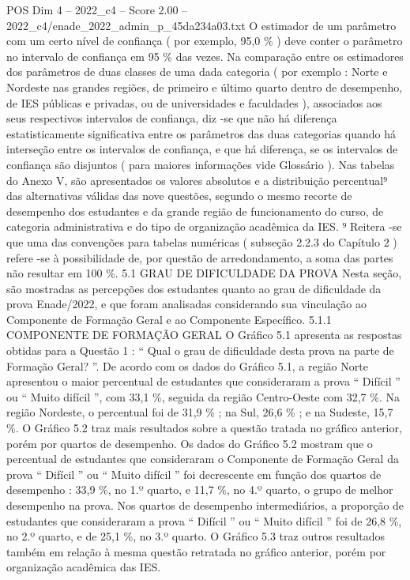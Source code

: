\begin{textsample}{POS Dim 4 – 2022\_c4 – Score 2.00 – 2022\_c4/enade\_2022\_admin\_p\_45da234a03.txt}
O estimador de um parâmetro com um certo nível de confiança ( por exemplo, 95,0 \% ) deve conter o parâmetro no intervalo de confiança em 95 \% das vezes.
Na comparação entre os estimadores dos parâmetros de duas classes de uma dada categoria ( por exemplo : Norte e Nordeste nas grandes regiões, de primeiro e último quarto dentro de desempenho, de IES públicas e privadas, ou de universidades e faculdades ), associados aos seus respectivos intervalos de confiança, diz -se que não há diferença estatisticamente significativa entre os parâmetros das duas categorias quando há interseção entre os intervalos de confiança, e que há diferença, se os intervalos de confiança são disjuntos ( para maiores informações vide Glossário ).
Nas tabelas do Anexo V, são apresentados os valores absolutos e a distribuição percentual⁹ das alternativas válidas das nove questões, segundo o mesmo recorte de desempenho dos estudantes e da grande região de funcionamento do curso, de categoria administrativa e do tipo de organização acadêmica da IES. ⁹ Reitera -se que uma das convenções para tabelas numéricas ( subseção 2.2.3 do Capítulo 2 ) refere -se à possibilidade de, por questão de arredondamento, a soma das partes não resultar em 100 \%. 5.1 GRAU DE DIFICULDADE DA PROVA Nesta seção, são mostradas as percepções dos estudantes quanto ao grau de dificuldade da prova Enade/2022, e que foram analisadas considerando sua vinculação ao Componente de Formação Geral e ao Componente Específico. 5.1.1 COMPONENTE DE FORMAÇÃO GERAL O Gráfico 5.1 apresenta as respostas obtidas para a Questão 1 : “ Qual o grau de dificuldade desta prova na parte de Formação Geral? ”.
De acordo com os dados do Gráfico 5.1, a região Norte apresentou o maior percentual de estudantes que consideraram a prova “ Difícil ” ou “ Muito difícil ”, com 33,1 \%, seguida da região Centro-Oeste com 32,7 \%.
Na região Nordeste, o percentual foi de 31,9 \% ; na Sul, 26,6 \% ; e na Sudeste, 15,7 \%.
O Gráfico 5.2 traz mais resultados sobre a questão tratada no gráfico anterior, porém por quartos de desempenho.
Os dados do Gráfico 5.2 mostram que o percentual de estudantes que consideraram o Componente de Formação Geral da prova “ Difícil ” ou “ Muito difícil ” foi decrescente em função dos quartos de desempenho : 33,9 \%, no 1.º quarto, e 11,7 \%, no 4.º quarto, o grupo de melhor desempenho na prova.
Nos quartos de desempenho intermediários, a proporção de estudantes que consideraram a prova “ Difícil ” ou “ Muito difícil ” foi de 26,8 \%, no 2.º quarto, e de 25,1 \%, no 3.º quarto.
O Gráfico 5.3 traz outros resultados também em relação à mesma questão retratada no gráfico anterior, porém por organização acadêmica das IES.

\end{textsample}
